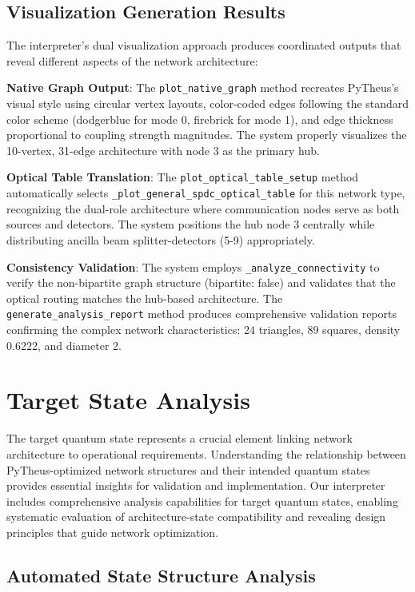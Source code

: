 \documentclass[11pt,a4paper]{article}
\begin{document}
\subsection{Visualization Generation Results}

The interpreter's dual visualization approach produces coordinated outputs that reveal different aspects of the network architecture:

\textbf{Native Graph Output}: The \texttt{plot\_native\_graph} method recreates PyTheus's visual style using circular vertex layouts, color-coded edges following the standard color scheme (dodgerblue for mode 0, firebrick for mode 1), and edge thickness proportional to coupling strength magnitudes. The system properly visualizes the 10-vertex, 31-edge architecture with node 3 as the primary hub.

\textbf{Optical Table Translation}: The \texttt{plot\_optical\_table\_setup} method automatically selects \texttt{\_plot\_general\_spdc\_optical\_table} for this network type, recognizing the dual-role architecture where communication nodes serve as both sources and detectors. The system positions the hub node 3 centrally while distributing ancilla beam splitter-detectors (5-9) appropriately.

\textbf{Consistency Validation}: The system employs \texttt{\_analyze\_connectivity} to verify the non-bipartite graph structure (bipartite: false) and validates that the optical routing matches the hub-based architecture. The \texttt{generate\_analysis\_report} method produces comprehensive validation reports confirming the complex network characteristics: 24 triangles, 89 squares, density 0.6222, and diameter 2.

\section{Target State Analysis}

The target quantum state represents a crucial element linking network architecture to operational requirements. Understanding the relationship between PyTheus-optimized network structures and their intended quantum states provides essential insights for validation and implementation. Our interpreter includes comprehensive analysis capabilities for target quantum states, enabling systematic evaluation of architecture-state compatibility and revealing design principles that guide network optimization.

\subsection{Automated State Structure Analysis}
\end{document}
